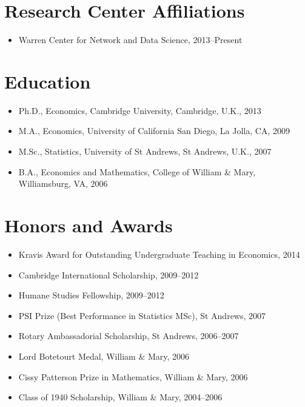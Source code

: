 \documentclass[11pt,line,overlapped,letterpaper]{myres}
\begin{document}
\begin{resume}
\section{\sc Research Center Affiliations}
\begin{itemize}
\item Warren Center for Network and Data Science, 2013--Present
\end{itemize}

\section{\sc Education}
\begin{itemize}
\item Ph.D., Economics, Cambridge University, Cambridge, U.K., 2013
\item M.A., Economics, University of California San Diego, La Jolla, CA, 2009
\item M.Sc., Statistics, University of St Andrews, St Andrews, U.K., 2007
\item B.A., Economics and Mathematics, College of William \& Mary, Williamsburg, VA, 2006
\end{itemize}




\section{\sc Honors and Awards}
\vspace{1em}
\begin{itemize}
\item Kravis Award for Outstanding Undergraduate Teaching in Economics, 2014
\item Cambridge International Scholarship, 2009--2012
\item Humane Studies Fellowship, 2009--2012
\item PSI Prize (Best Performance in Statistics MSc), St Andrews, 2007
\item Rotary Ambassadorial Scholarship, St Andrews, 2006--2007
\item Lord Botetourt Medal, William \& Mary, 2006
\item Cissy Patterson Prize in Mathematics, William \& Mary, 2006
\item Class of 1940 Scholarship, William \& Mary, 2004--2006
\end{itemize}


\end{resume}
\end{document}
